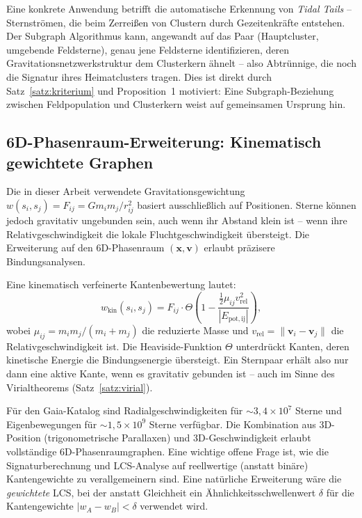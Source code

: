 ﻿\documentclass[a4paper,12pt]{report}
\theoremstyle{definition}
\begin{document}
Eine konkrete Anwendung betrifft die automatische Erkennung von \emph{Tidal Tails} -- Sternströmen, die beim Zerreißen von Clustern durch Gezeitenkräfte entstehen. Der Subgraph Algorithmus kann, angewandt auf das Paar (Hauptcluster, umgebende Feldsterne), genau jene Feldsterne identifizieren, deren Gravitationsnetzwerkstruktur dem Clusterkern ähnelt -- also Abtrünnige, die noch die Signatur ihres Heimatclusters tragen. Dies ist direkt durch Satz~\ref{satz:kriterium} und Proposition~1 motiviert: Eine Subgraph-Beziehung zwischen Feldpopulation und Clusterkern weist auf gemeinsamen Ursprung hin.

\subsection{6D-Phasenraum-Erweiterung: Kinematisch gewichtete Graphen}

Die in dieser Arbeit verwendete Gravitationsgewichtung $w(s_i, s_j) = F_{ij} = G m_i m_j / r_{ij}^2$ basiert ausschließlich auf Positionen. Sterne können jedoch gravitativ ungebunden sein, auch wenn ihr Abstand klein ist -- wenn ihre Relativgeschwindigkeit die lokale Fluchtgeschwindigkeit übersteigt. Die Erweiterung auf den 6D-Phasenraum $({\mathbf{x}}, {\mathbf{v}})$ erlaubt präzisere Bindungsanalysen.

Eine kinematisch verfeinerte Kantenbewertung lautet:
\[
w_\mathrm{kin}(s_i, s_j) = F_{ij} \cdot \Theta\!\left(1 - \frac{\frac{1}{2}\mu_{ij} v_\mathrm{rel}^2}{|E_\mathrm{pot,ij}|}\right),
\]
wobei $\mu_{ij} = m_i m_j / (m_i + m_j)$ die reduzierte Masse und $v_\mathrm{rel} = \|\mathbf{v}_i - \mathbf{v}_j\|$ die Relativgeschwindigkeit ist. Die Heaviside-Funktion $\Theta$ unterdrückt Kanten, deren kinetische Energie die Bindungsenergie übersteigt. Ein Sternpaar erhält also nur dann eine aktive Kante, wenn es gravitativ gebunden ist -- auch im Sinne des Virialtheorems (Satz~\ref{satz:virial}).

Für den Gaia-Katalog sind Radialgeschwindigkeiten für $\sim 3{,}4 \times 10^7$ Sterne und Eigenbewegungen für $\sim 1{,}5 \times 10^9$ Sterne verfügbar. Die Kombination aus 3D-Position (trigonometrische Parallaxen) und 3D-Geschwindigkeit erlaubt vollständige 6D-Phasenraumgraphen. Eine wichtige offene Frage ist, wie die Signaturberechnung und LCS-Analyse auf reellwertige (anstatt binäre) Kantengewichte zu verallgemeinern sind. Eine natürliche Erweiterung wäre die \emph{gewichtete} LCS, bei der anstatt Gleichheit ein Ähnlichkeitsschwellenwert $\delta$ für die Kantengewichte $|w_A - w_B| < \delta$ verwendet wird.
\end{document}
